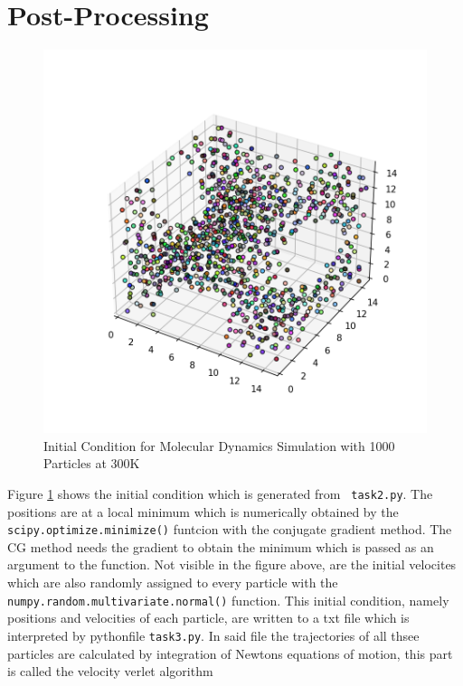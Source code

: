 \section*{Post-Processing}


\begin{figure}[ht]
    \centering
    \includegraphics[width=1\textwidth]{figures/3d_plot_IC.png}
	\caption{Initial Condition for Molecular Dynamics Simulation with 1000 Particles at 300K}
	\label{3d_plot_IC}
\end{figure}

Figure \ref{3d_plot_IC} shows the initial condition which is generated from \texttt{ task2.py}. The positions are at a local minimum which is numerically obtained
by the \texttt{scipy.optimize.minimize()} funtcion with the conjugate gradient method. The CG method needs the gradient to obtain the minimum which is passed
as an argument to the function. Not visible in the figure above, are the initial velocites which are also randomly assigned to every particle with the \texttt{numpy.random.multivariate.normal()}
function. This initial condition, namely positions and velocities of each particle, are written to a txt file which is interpreted by pythonfile \texttt{task3.py}.
In said file the trajectories of all thsee particles are calculated by integration of Newtons equations of motion, this part is called the velocity verlet algorithm

